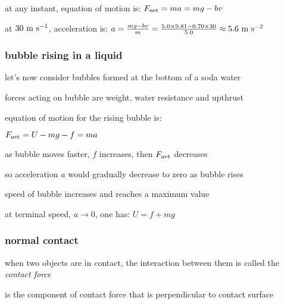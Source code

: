 at any instant, equation of motion is: $F_\text{net} = ma = mg - bv$

at $30\text{ m s$^{-1}$}$, acceleration is: $a = \frac{mg-bv}{m} = \frac{5.0\times9.81-0.70\times30}{5.0} \approx 5.6 \text{ m s$^{-2}$}$ \eoe

\subsubsection*{bubble rising in a liquid}

\begin{wrapfigure}{r}{0.15\textwidth}
	\vspace*{-16pt}
	\centering
	\vspace*{-16pt}
\end{wrapfigure}

let's now consider bubbles formed at the bottom of a soda water

forces acting on bubble are weight, water resistance and upthrust

equation of motion for the rising bubble is:

{
	\centering
	
	$ F_\text{net} = U - mg - f = ma $
	
}

as bubble moves faster, $f$ increases, then $F_\text{net}$ decreases

so acceleration $a$ would gradually decrease to zero as bubble rises

speed of bubble increases and reaches a maximum value

at terminal speed, $a\to0$, one has: $U=f+mg$



\subsubsection{normal contact}

when two objects are in contact, the interaction between them is called the \emph{contact force}

 is the component of contact force that is perpendicular to contact surface

